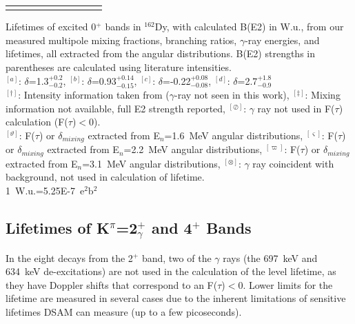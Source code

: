 \begin{landscape}
\begin{center}
\begin{longtable}{cllcccllll}
\vspace{10pt}
\end{longtable}
\end{center}
Lifetimes of excited 0$^+$ bands in $^{162}$Dy, with calculated B(E2) in W.u., from our measured multipole mixing fractions, branching ratios, $\gamma$-ray energies, and lifetimes, all extracted from the angular distributions. B(E2) strengths in parentheses are calculated using literature intensities.\\
 $^{[a]}$: $\delta$=1.3$^{+0.2}_{-0.2}$,
 $^{[b]}$: $\delta$=0.93$^{+0.14}_{-0.15}$,
 $^{[c]}$: $\delta$=-0.22$^{+0.08}_{-0.08}$,
 $^{[d]}$: $\delta$=2.7$^{+1.8}_{-0.9}$\\
 $^{[\dagger]}$: Intensity information taken from \cite{Aprahamian200642,Zamfir_162Dy0_1999} ($\gamma$-ray not seen in this work),
 $^{[\ddagger]}$: Mixing information not available, full E2 strength reported,
 $^{[\oslash]}$: $\gamma$ ray not used in F($\tau$) calculation (F($\tau$)$<$0).\\
 $^{[\vartheta]}$: F($\tau$) or $\delta_{mixing}$ extracted from E$_n$=1.6~MeV angular distributions,
 $^{[\varsigma]}$: F($\tau$) or $\delta_{mixing}$ extracted from E$_n$=2.2~MeV angular distributions,
 $^{[\varpi]}$: F($\tau$) or $\delta_{mixing}$ extracted from E$_n$=3.1~MeV angular distributions,
 $^{[\otimes]}$: $\gamma$ ray coincident with background, not used in calculation of lifetime.\\
 1~W.u.=5.25E-7~e$^2$b$^2$
\end{landscape}

\subsection{Lifetimes of K$^\pi$=2$^+_\gamma$ and 4$^+$ Bands}

In the eight decays from the 2$^+$ band, two of the $\gamma$ rays (the 697~keV and 634~keV de-excitations) are not used in the calculation of the level lifetime, as they have Doppler shifts that correspond to an F($\tau$)$<$0. Lower limits for the lifetime are measured in several cases due to the inherent limitations of sensitive lifetimes DSAM can measure (up to a few picoseconds).


